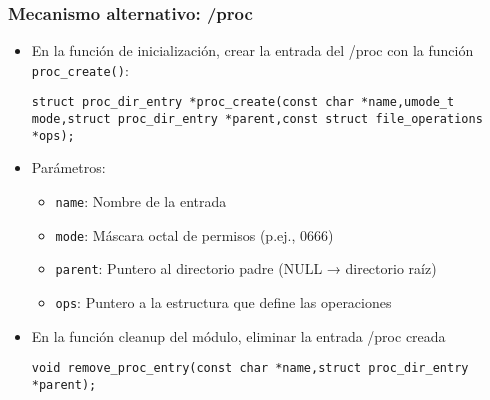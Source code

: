 \begin{frame}[fragile]
\frametitle{Mecanismo alternativo: /proc}
  \begin{itemize}
         \item En la función de inicialización, crear la entrada del /proc con la función \texttt{proc\_create()}:
\begin{lstlisting}
struct proc_dir_entry *proc_create(const char *name,umode_t mode,struct proc_dir_entry *parent,const struct file_operations *ops);
\end{lstlisting}
    \item Parámetros:
      \begin{itemize}
        \item \texttt{name}: Nombre de la entrada
        \item \texttt{mode}: Máscara octal de permisos (p.ej., 0666)
        \item \texttt{parent}: Puntero al directorio padre (NULL → directorio raíz)
        \item \texttt{ops}: Puntero a la estructura que define las operaciones
      \end{itemize}
    \item En la función cleanup del módulo, eliminar la entrada /proc creada
\begin{lstlisting}
void remove_proc_entry(const char *name,struct proc_dir_entry *parent);
\end{lstlisting}
 \end{itemize}	
\end{frame}

